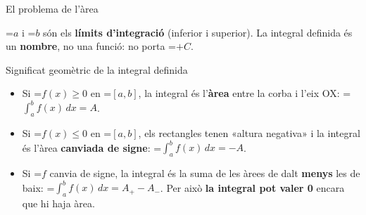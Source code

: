 \documentclass[11pt,a4paper]{article}
\newcommand{\fmm}[1]{\setbox0=\hbox{$#1$}\ifdim\wd0>\linewidth\[#1\]\else\mbox{\box0}\fi}
\begin{document}
\begin{fmdef}{El problema de l'àrea}
      
\begin{fmnote}\fmm{a} i \fmm{b} són els \textbf{límits d'integració} (inferior i superior). La integral definida és un \textbf{nombre}, no una funció: no porta \fmm{+C}.\end{fmnote}
\end{fmdef}

  
\begin{fmprop}{Significat geomètric de la integral definida}
\par\noindent \begin{minipage}[t]{0.48\linewidth}\vspace{0pt}\raggedright \begin{itemize}
\item Si \fmm{f(x)\geq0} en \fmm{[a,b]}, la integral és l'\textbf{àrea} entre la corba i l'eix OX: \fmm{\displaystyle\int_a^b f(x)\,dx=A}.
\item Si \fmm{f(x)\leq0} en \fmm{[a,b]}, els rectangles tenen «altura negativa» i la integral és l'àrea \textbf{canviada de signe}: \fmm{\displaystyle\int_a^b f(x)\,dx=-A}.
\item Si \fmm{f} canvia de signe, la integral és la suma de les àrees de dalt \textbf{menys} les de baix: \fmm{\displaystyle\int_a^b f(x)\,dx=A_{+}-A_{-}}. Per això \textbf{la integral pot valer 0} encara que hi haja àrea.

\end{itemize}
\end{minipage}
\end{fmprop}
\end{document}
